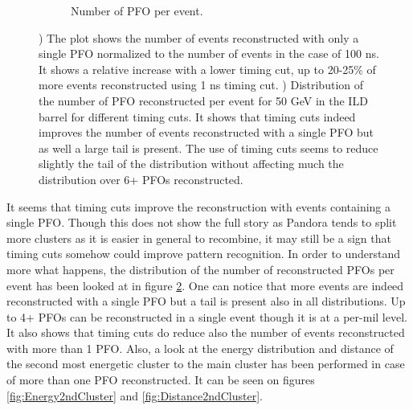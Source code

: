 \begin{figure}[htbp!]
\begin{subfigure}[t]{0.49\textwidth}
    \caption{Number of PFO per event.} \label{fig:DistriPFO}
  \end{subfigure}
  \caption{) The plot shows the number of events reconstructed with only a single PFO normalized to the number of events in the case of 100 ns. It shows a relative increase with a lower timing cut, up to 20-25\% of more events reconstructed using 1 ns timing cut. ) Distribution of the number of PFO reconstructed per event for 50 GeV \kzeroL{} in the ILD barrel for different timing cuts. It shows that timing cuts indeed improves the number of events reconstructed with a single PFO but as well a large tail is present. The use of timing cuts seems to reduce slightly the tail of the distribution without affecting much the distribution over 6+ PFOs reconstructed.}
\end{figure}

It seems that timing cuts improve the reconstruction with events containing a single PFO. Though this does not show the full story as Pandora tends to split more clusters as it is easier in general to recombine, it may still be a sign that timing cuts somehow could improve pattern recognition. In order to understand more what happens, the distribution of the number of reconstructed PFOs per event has been looked at in figure \ref{fig:DistriPFO}. One can notice that more events are indeed reconstructed with a single PFO but a tail is present also in all distributions. Up to 4+ PFOs can be reconstructed in a single event though it is at a per-mil level. It also shows that timing cuts do reduce also the number of events reconstructed with more than 1 PFO. Also, a look at the energy distribution and distance of the second most energetic cluster to the main cluster has been performed in case of more than one PFO reconstructed. It can be seen on figures \ref{fig:Energy2ndCluster} and \ref{fig:Distance2ndCluster}.

